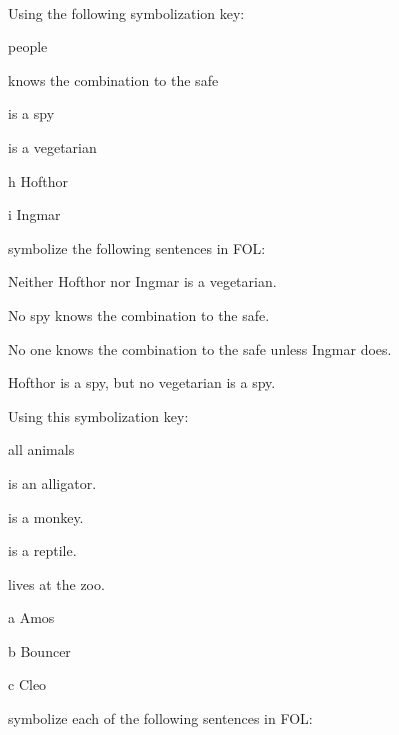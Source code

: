\

\problempart
\label{pr.FOLvegetarians}
Using the following symbolization key:
\begin{ekey}
\item[\text{domain}] people
\item[\atom{K}{x}]  knows the combination to the safe
\item[\atom{S}{x}]  is a spy
\item[\atom{V}{x}]  is a vegetarian
\item[h] Hofthor
\item[i] Ingmar
\end{ekey}
symbolize the following sentences in FOL:
\begin{earg}
\item Neither Hofthor nor Ingmar is a vegetarian.
\item No spy knows the combination to the safe.
\item No one knows the combination to the safe unless Ingmar does.
\item Hofthor is a spy, but no vegetarian is a spy.
\end{earg}
\solutions
\problempart\label{pr.FOLalligators}
Using this symbolization key:
\begin{ekey}
\item[\text{domain}] all animals
\item[\atom{A}{x}]  is an alligator.
\item[\atom{M}{x}]  is a monkey.
\item[\atom{R}{x}]  is a reptile.
\item[\atom{Z}{x}]  lives at the zoo.
\item[a] Amos
\item[b] Bouncer
\item[c] Cleo
\end{ekey}
symbolize each of the following sentences in FOL:
